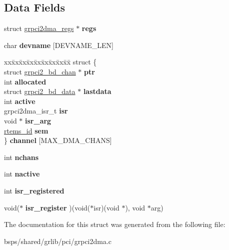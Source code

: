 \subsection*{Data Fields}
\begin{DoxyCompactItemize}
\item 
\mbox{\label{structgrpci2dma__priv_a3e13481a4b66367d7ac1499fcca74d34}} 
struct \mbox{\hyperlink{structgrpci2dma__regs}{grpci2dma\+\_\+regs}} $\ast$ {\bfseries regs}
\item 
\mbox{\label{structgrpci2dma__priv_ac94bfcbd8c979d974559a2ee2101ff7d}} 
char {\bfseries devname} \mbox{[}D\+E\+V\+N\+A\+M\+E\+\_\+\+L\+EN\mbox{]}
\item 
\mbox{\label{structgrpci2dma__priv_ad7df7b4593df4d9ba3ff995abf8a373a}} 
\begin{tabbing}
xx\=xx\=xx\=xx\=xx\=xx\=xx\=xx\=xx\=\kill
struct \{\\
\>struct \mbox{\hyperlink{structgrpci2__bd__chan}{grpci2\_bd\_chan}} $\ast$ {\bfseries ptr}\\
\>int {\bfseries allocated}\\
\>struct \mbox{\hyperlink{structgrpci2__bd__data}{grpci2\_bd\_data}} $\ast$ {\bfseries lastdata}\\
\>int {\bfseries active}\\
\>grpci2dma\_isr\_t {\bfseries isr}\\
\>void $\ast$ {\bfseries isr\_arg}\\
\>\mbox{\hyperlink{group__ClassicTasks_gab20892b814dced7dd4e5b9bf42becd57}{rtems\_id}} {\bfseries sem}\\
\} {\bfseries channel} \mbox{[}MAX\_DMA\_CHANS\mbox{]}\\

\end{tabbing}\item 
\mbox{\label{structgrpci2dma__priv_aa6a17990ac83183f03edcbdfd9e5b4b9}} 
int {\bfseries nchans}
\item 
\mbox{\label{structgrpci2dma__priv_a68e0237a1c5262220a3ba8afa4cc8733}} 
int {\bfseries nactive}
\item 
\mbox{\label{structgrpci2dma__priv_ac0897499c72181bcb5872a9ff9cf5ebc}} 
int {\bfseries isr\+\_\+registered}
\item 
\mbox{\label{structgrpci2dma__priv_a7bff26f955ccf5550315337ce12ca4d2}} 
void($\ast$ {\bfseries isr\+\_\+register} )(void($\ast$isr)(void $\ast$), void $\ast$arg)
\end{DoxyCompactItemize}


The documentation for this struct was generated from the following file\+:\begin{DoxyCompactItemize}
\item 
bsps/shared/grlib/pci/grpci2dma.\+c\end{DoxyCompactItemize}
